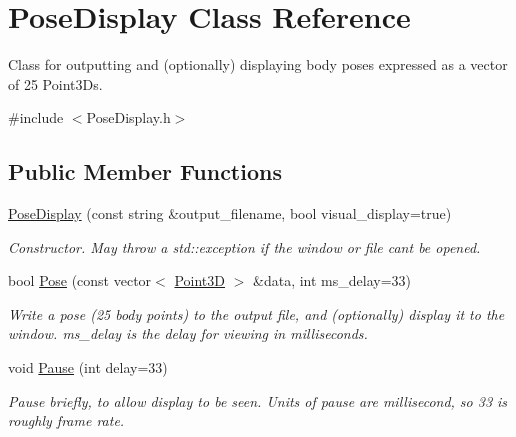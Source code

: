 \hypertarget{classPoseDisplay}{}\section{Pose\+Display Class Reference}
\label{classPoseDisplay}


Class for outputting and (optionally) displaying body poses expressed as a vector of 25 Point3\+Ds.  




{\ttfamily \#include $<$Pose\+Display.\+h$>$}

\subsection*{Public Member Functions}
\begin{DoxyCompactItemize}
\item 
\hyperlink{classPoseDisplay_aa1b69b1d84ef195caccbc763d1028c60}{Pose\+Display} (const string \&output\+\_\+filename, bool visual\+\_\+display=true)
\begin{DoxyCompactList}\small\item\em Constructor. May throw a std\+::exception if the window or file can\textquotesingle{}t be opened. \end{DoxyCompactList}\item 
\hypertarget{classPoseDisplay_a40edcdb672d0f785c4966021d6a2c9e2}{}bool \hyperlink{classPoseDisplay_a40edcdb672d0f785c4966021d6a2c9e2}{Pose} (const vector$<$ \hyperlink{classPoint3D}{Point3\+D} $>$ \&data, int ms\+\_\+delay=33)\label{classPoseDisplay_a40edcdb672d0f785c4966021d6a2c9e2}

\begin{DoxyCompactList}\small\item\em Write a pose (25 body points) to the output file, and (optionally) display it to the window. ms\+\_\+delay is the delay for viewing in milliseconds. \end{DoxyCompactList}\item 
\hypertarget{classPoseDisplay_a7dfe55ebb0ea62ba9f6852e2e61ec3d3}{}void \hyperlink{classPoseDisplay_a7dfe55ebb0ea62ba9f6852e2e61ec3d3}{Pause} (int delay=33)\label{classPoseDisplay_a7dfe55ebb0ea62ba9f6852e2e61ec3d3}

\begin{DoxyCompactList}\small\item\em Pause briefly, to allow display to be seen. Units of pause are millisecond, so 33 is roughly frame rate. \end{DoxyCompactList}\end{DoxyCompactItemize}
